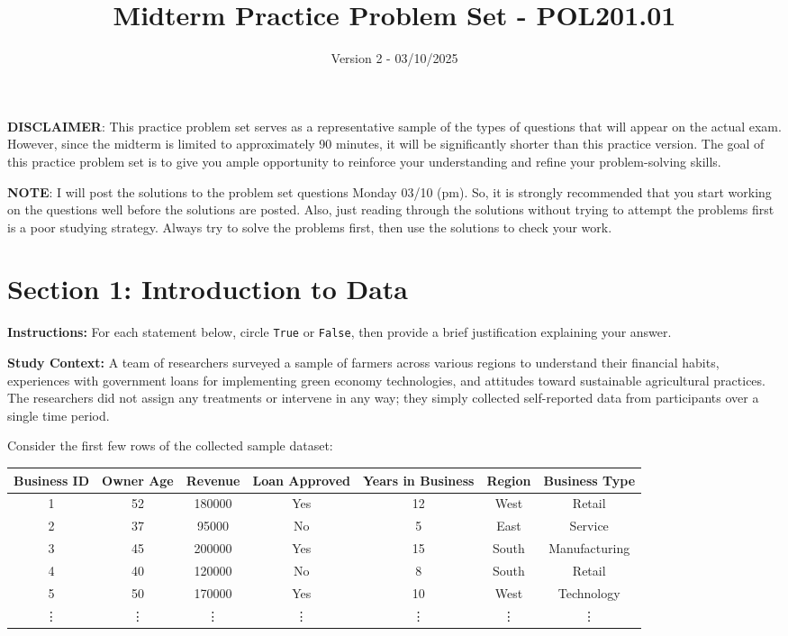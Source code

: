 \documentclass{article}
\title{Midterm Practice Problem Set - POL201.01}
\author{Version 2 - 03/10/2025}
\date{}
\begin{document}
\maketitle

\textbf{DISCLAIMER}: This practice problem set serves as a representative sample of the types of questions that will appear on the actual exam. However, since the midterm is limited to approximately 90 minutes, it will be significantly shorter than this practice version. The goal of this practice problem set is to give you ample opportunity to reinforce your understanding and refine your problem-solving skills.

\textbf{NOTE}: I will post the solutions to the problem set questions Monday 03/10 (pm). So, it is strongly recommended that you start working on the questions well before the solutions are posted. Also, just reading through the solutions without trying to attempt the problems first is a poor studying strategy. Always try to solve the problems first, then use the solutions to check your work.

\section*{Section 1: Introduction to Data}

\noindent\textbf{Instructions:}
For each statement below, circle \texttt{True} or \texttt{False}, then provide a brief justification explaining your answer.

\vspace{0.5cm}

\noindent \textbf{Study Context:}
A team of researchers surveyed a sample of farmers across various regions to understand their financial habits, experiences with government loans for implementing green economy technologies, and attitudes toward sustainable agricultural practices. The researchers did not assign any treatments or intervene in any way; they simply collected self-reported data from participants over a single time period.

\vspace{0.5cm}
\noindent Consider the first few rows of the collected sample dataset:

\begin{center}
\small
\begin{tabular}{c|c|c|c|c|c|c}
\textbf{Business ID} & \textbf{Owner Age} & \textbf{Revenue} & \textbf{Loan Approved} & \textbf{Years in Business} & \textbf{Region} & \textbf{Business Type}\\
\hline
1 & 52 & 180000 & Yes & 12 & West & Retail\\
2 & 37 & 95000 & No & 5 & East & Service\\
3 & 45 & 200000 & Yes & 15 & South & Manufacturing\\
4 & 40 & 120000 & No & 8 & South & Retail\\
5 & 50 & 170000 & Yes & 10 & West & Technology\\
\vdots & \vdots & \vdots & \vdots & \vdots & \vdots & \vdots
\end{tabular}
\normalsize
\end{center}
\end{document}
